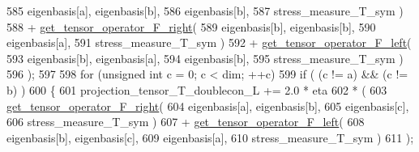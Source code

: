 \begin{DoxyCode}
585                                                                 eigenbasis[a], eigenbasis[b],
586                                                                 eigenbasis[b],
587                                                                 stress\_measure\_T\_sym )
588                                                           + 
      \hyperlink{functions_8h_acfd8da38df3766246f7bcf0e736ad9f4}{get\_tensor\_operator\_F\_right}(
589                                                                 eigenbasis[b], eigenbasis[b],
590                                                                 eigenbasis[a],
591                                                                 stress\_measure\_T\_sym )
592                                                           + 
      \hyperlink{functions_8h_a6f9435c7728281851248d3537c100e7d}{get\_tensor\_operator\_F\_left}(
593                                                                 eigenbasis[b], eigenbasis[a],
594                                                                 eigenbasis[b],
595                                                                 stress\_measure\_T\_sym )
596                                                            );
597 
598                     \textcolor{keywordflow}{for} (\textcolor{keywordtype}{unsigned} \textcolor{keywordtype}{int} c = 0; c < dim; ++c)
599                         \textcolor{keywordflow}{if} ( (c != a) && (c != b) )
600                         \{
601                             projection\_tensor\_T\_doublecon\_L += 2.0 * eta
602                                                                * (
603                                                                       
      \hyperlink{functions_8h_acfd8da38df3766246f7bcf0e736ad9f4}{get\_tensor\_operator\_F\_right}(
604                                                                         eigenbasis[a], eigenbasis[b],
605                                                                         eigenbasis[c],
606                                                                         stress\_measure\_T\_sym )
607                                                                     + 
      \hyperlink{functions_8h_a6f9435c7728281851248d3537c100e7d}{get\_tensor\_operator\_F\_left}(
608                                                                         eigenbasis[b], eigenbasis[c],
609                                                                         eigenbasis[a],
610                                                                         stress\_measure\_T\_sym )
611                                                                   );

\end{DoxyCode}
